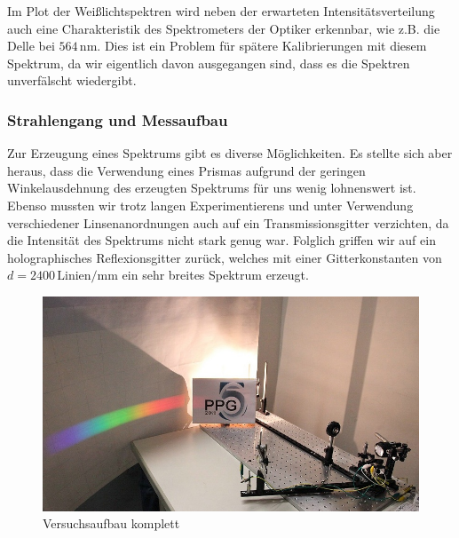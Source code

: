 \documentclass[11pt]{scrartcl}
\newcommand{\unit}[1]{\ensuremath{\,\mathrm{#1}}} %
\begin{document}
Im Plot der Weißlichtspektren wird neben der erwarteten Intensitätsverteilung auch eine Charakteristik des Spektrometers der Optiker erkennbar, wie z.B. die Delle bei $564\unit{nm}$. Dies ist ein Problem für spätere Kalibrierungen mit diesem Spektrum, da wir eigentlich davon ausgegangen sind, dass es die Spektren unverfälscht wiedergibt.


\subsubsection{Strahlengang und Messaufbau} %
Zur Erzeugung eines Spektrums gibt es diverse M\"oglichkeiten. Es stellte sich aber heraus, dass die Verwendung eines Prismas aufgrund der geringen Winkelausdehnung des erzeugten Spektrums f\"ur uns wenig lohnenswert ist. Ebenso mussten wir trotz langen Experimentierens und unter Verwendung verschiedener Linsenanordnungen auch auf ein Transmissionsgitter verzichten, da die Intensit\"at des Spektrums nicht stark genug war. Folglich griffen wir auf ein holographisches Reflexionsgitter zur\"uck, welches mit einer Gitterkonstanten von $d=2400\unit{\text{Linien}/mm}$ ein sehr breites Spektrum erzeugt.%

\begin{figure}[H]
\begin{center}
\includegraphics[width=1.\textwidth]{aufbau_spektrum.jpg}
\end{center}
\vspace{-1.5\baselineskip}
\caption{Versuchsaufbau komplett}
\label{fig:aufbau_spektrum}
\end{figure}
\end{document}
